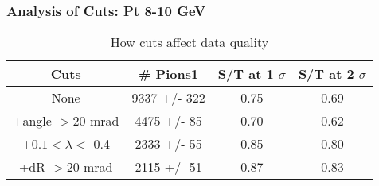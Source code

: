 \frame
{
\frametitle{Analysis of Cuts: Pt  8-10 GeV}
\begin{table}
\caption{How cuts affect data quality}
\centering
\begin{tabular}{c c c c}
\hline\hline
Cuts & \# Pions1 & S/T at 1 $\sigma$ & S/T at 2 $\sigma$ \\ [0.5ex]
\hline
None & 9337 +/-  322 & 0.75 & 0.69 \\ %
+angle $> 20$ mrad & 4475 +/-   85 & 0.70 & 0.62 \\ %
+$0.1 < \lambda <$ 0.4 & 2333 +/-   55 & 0.85 & 0.80 \\ %
+dR $> 20$ mrad & 2115 +/-   51 & 0.87 & 0.83 \\ %
[1ex]
\hline
\end{tabular}
\label{table:nonlin}
\end{table}
}
